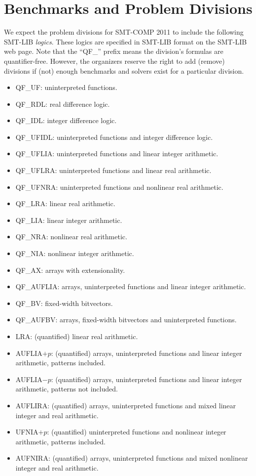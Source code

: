 \documentclass[12pt]{article}
\begin{document}
\section{Benchmarks and Problem Divisions}
\label{sec:theories}


We expect the problem divisions for SMT-COMP 2011 to include the following
SMT-LIB \emph{logics}.  These logics are specified in SMT-LIB format on the
SMT-LIB web page.  Note that the ``QF\_'' prefix means the division's
formulas are quantifier-free.  However, the organizers reserve the right to add
(remove) divisions if (not) enough benchmarks and solvers exist for a
particular division.


\begin{itemize}
\item QF\_UF: uninterpreted functions.
\item QF\_RDL: real difference logic.
\item QF\_IDL: integer difference logic.
\item QF\_UFIDL: uninterpreted functions and integer difference logic.
\item QF\_UFLIA: uninterpreted functions and linear integer arithmetic.
\item QF\_UFLRA: uninterpreted functions and linear real arithmetic.
\item QF\_UFNRA: uninterpreted functions and nonlinear real arithmetic.
\item QF\_LRA: linear real arithmetic.
\item QF\_LIA: linear integer arithmetic.
\item QF\_NRA: nonlinear real arithmetic.
\item QF\_NIA: nonlinear integer arithmetic.
\item QF\_AX: arrays with extensionality.
\item QF\_AUFLIA: arrays, uninterpreted functions and linear integer 
                  arithmetic.
\item QF\_BV: fixed-width bitvectors.
\item QF\_AUFBV: arrays, fixed-width bitvectors and uninterpreted
functions.
\item LRA: (quantified) linear real arithmetic.
\item AUFLIA$+p$: (quantified) arrays, uninterpreted functions and 
linear integer arithmetic, patterns included.
\item AUFLIA$-p$: (quantified) arrays, uninterpreted functions and 
linear integer arithmetic, patterns not included.
\item AUFLIRA: (quantified) arrays, uninterpreted functions and 
mixed linear integer and real arithmetic.
\item UFNIA$+p$: (quantified) uninterpreted functions and 
nonlinear integer arithmetic, patterns included.
\item AUFNIRA: (quantified) arrays, uninterpreted functions and 
mixed nonlinear integer and real arithmetic.
\end{itemize}
\end{document}
